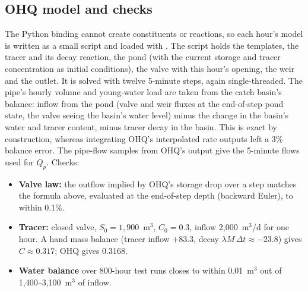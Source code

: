 \subsection{OHQ model and checks}
The Python binding cannot create constituents or reactions, so each hour's
model is written as a small  script and loaded with
. The script holds the templates, the tracer and
its decay reaction, the pond (with the current storage and tracer
concentration as initial conditions), the valve with this hour's opening,
the weir and the outlet. It is solved with twelve 5-minute steps, again
single-threaded. The pipe's hourly volume and young-water load are taken
from the catch basin's balance: inflow from the pond (valve and weir fluxes
at the end-of-step pond state, the valve seeing the basin's water level)
minus the change in the basin's water and tracer content, minus tracer
decay in the basin. This is exact by construction, whereas integrating
OHQ's interpolated rate outputs left a 3\% balance error. The pipe-flow
samples from OHQ's output give the 5-minute flows used for $Q_p$. Checks:
\begin{itemize}\itemsep1pt
\item \textbf{Valve law:} the outflow implied by OHQ's storage drop over a
step matches the formula above, evaluated at the end-of-step depth
(backward Euler), to within 0.1\%.
\item \textbf{Tracer:} closed valve, $S_0=1{,}900$~m$^3$, $C_0=0.3$, inflow
2{,}000~m$^3$/d for one hour. A hand mass balance (tracer inflow $+83.3$,
decay $\lambda M\,\Delta t\approx-23.8$) gives $C\approx0.317$; OHQ gives
0.3168.
\item \textbf{Water balance} over 800-hour test runs closes to within
0.01~m$^3$ out of 1{,}400--3{,}100~m$^3$ of inflow.
\end{itemize}
